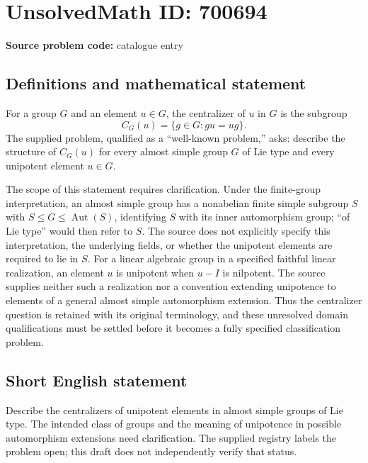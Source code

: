 \documentclass[11pt]{article}
\begin{document}
\section*{UnsolvedMath ID: 700694}
\textbf{Source problem code:} catalogue entry
\subsection{Definitions and mathematical statement}
For a group \(G\) and an element \(u\in G\), the centralizer of \(u\) in \(G\) is the subgroup
\[
C_G(u)=\{g\in G:gu=ug\}.
\]
The supplied problem, qualified as a ``well-known problem,'' asks: describe the structure of \(C_G(u)\) for every almost simple group \(G\) of Lie type and every unipotent element \(u\in G\).

The scope of this statement requires clarification. Under the finite-group interpretation, an almost simple group has a nonabelian finite simple subgroup \(S\) with \(S\leq G\leq\operatorname{Aut}(S)\), identifying \(S\) with its inner automorphism group; ``of Lie type'' would then refer to \(S\). The source does not explicitly specify this interpretation, the underlying fields, or whether the unipotent elements are required to lie in \(S\). For a linear algebraic group in a specified faithful linear realization, an element \(u\) is unipotent when \(u-I\) is nilpotent. The source supplies neither such a realization nor a convention extending unipotence to elements of a general almost simple automorphism extension. Thus the centralizer question is retained with its original terminology, and these unresolved domain qualifications must be settled before it becomes a fully specified classification problem.
\subsection{Short English statement}
Describe the centralizers of unipotent elements in almost simple groups of Lie type. The intended class of groups and the meaning of unipotence in possible automorphism extensions need clarification. The supplied registry labels the problem open; this draft does not independently verify that status.
\end{document}

